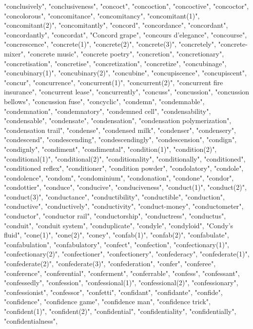 "conclusively",
"conclusiveness",
"concoct",
"concoction",
"concoctive",
"concoctor",
"concolorous",
"concomitance",
"concomitancy",
"concomitant(1)",
"concomitant(2)",
"concomitantly",
"concord",
"concordance",
"concordant",
"concordantly",
"concordat",
"Concord grape",
"concours d'elegance",
"concourse",
"concrescence",
"concrete(1)",
"concrete(2)",
"concrete(3)",
"concretely",
"concrete-mixer",
"concrete music",
"concrete poetry",
"concretion",
"concretionary",
"concretisation",
"concretise",
"concretization",
"concretize",
"concubinage",
"concubinary(1)",
"concubinary(2)",
"concubine",
"concupiscence",
"concupiscent",
"concur",
"concurrence",
"concurrent(1)",
"concurrent(2)",
"concurrent fire insurance",
"concurrent lease",
"concurrently",
"concuss",
"concussion",
"concussion bellows",
"concussion fuse",
"concyclic",
"condemn",
"condemnable",
"condemnation",
"condemnatory",
"condemned cell",
"condensability",
"condensable",
"condensate",
"condensation",
"condensation polymerization",
"condensation trail",
"condense",
"condensed milk",
"condenser",
"condensery",
"condescend",
"condescending",
"condescendingly",
"condescension",
"condign",
"condignly",
"condiment",
"condimental",
"condition(1)",
"condition(2)",
"conditional(1)",
"conditional(2)",
"conditionality",
"conditionally",
"conditioned",
"conditioned reflex",
"conditioner",
"condition powder",
"condolatory",
"condole",
"condolence",
"condom",
"condominium",
"condonation",
"condone",
"condor",
"condottier",
"conduce",
"conducive",
"conduciveness",
"conduct(1)",
"conduct(2)",
"conduct(3)",
"conductance",
"conductibility",
"conductible",
"conduction",
"conductive",
"conductively",
"conductivity",
"conduct-money",
"conductometer",
"conductor",
"conductor rail",
"conductorship",
"conductress",
"conductus",
"conduit",
"conduit system",
"conduplicate",
"condyle",
"condyloid",
"Condy's fluid",
"cone(1)",
"cone(2)",
"coney",
"confab(1)",
"confab(2)",
"confabulate",
"confabulation",
"confabulatory",
"confect",
"confection",
"confectionary(1)",
"confectionary(2)",
"confectioner",
"confectionery",
"confederacy",
"confederate(1)",
"confederate(2)",
"confederate(3)",
"confederation",
"confer",
"conferee",
"conference",
"conferential",
"conferment",
"conferrable",
"confess",
"confessant",
"confessedly",
"confession",
"confessional(1)",
"confessional(2)",
"confessionary",
"confessionist",
"confessor",
"confetti",
"confidant",
"confidante",
"confide",
"confidence",
"confidence game",
"confidence man",
"confidence trick",
"confident(1)",
"confident(2)",
"confidential",
"confidentiality",
"confidentially",
"confidentialness",
